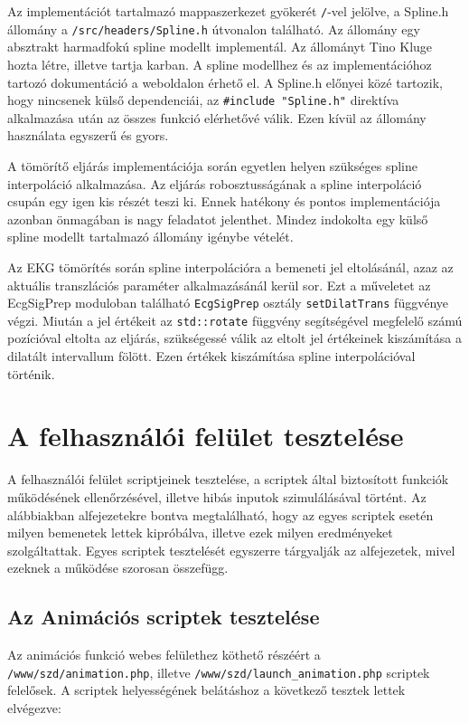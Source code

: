 \documentclass[oneside,titlepage,12pt,a4paper]{report}
\begin{document}
Az implementációt tartalmazó mappaszerkezet gyökerét \texttt{/}-vel jelölve, a Spline.h állomány a \texttt{/src/headers/Spline.h} útvonalon található. Az állomány egy absztrakt harmadfokú spline modellt implementál. Az állományt Tino Kluge hozta létre, illetve tartja karban. A spline modellhez és az implementációhoz tartozó dokumentáció a \cite{splineEler} weboldalon érhető el. A Spline.h előnyei közé tartozik, hogy nincsenek külső dependenciái, az \texttt{\#include "Spline.h"} direktíva alkalmazása után az összes funkció elérhetővé válik. Ezen kívül az állomány használata egyszerű és gyors.
\par A tömörítő eljárás implementációja során egyetlen helyen szükséges spline interpoláció alkalmazása. Az eljárás robosztusságának a spline interpoláció csupán egy igen kis részét teszi ki. Ennek hatékony és pontos implementációja azonban önmagában is nagy feladatot jelenthet. Mindez indokolta egy külső spline modellt tartalmazó állomány igénybe vételét. 
\par Az EKG tömörítés során spline interpolációra a bemeneti jel eltolásánál, azaz az aktuális transzlációs paraméter alkalmazásánál kerül sor. Ezt a műveletet az EcgSigPrep moduloban található \texttt{EcgSigPrep} osztály \texttt{setDilatTrans} függvénye végzi. Miután a jel értékeit az \texttt{std::rotate} függvény segítségével megfelelő számú pozícióval eltolta az eljárás, szükségessé válik az eltolt jel értékeinek kiszámítása a dilatált intervallum fölött. Ezen értékek kiszámítása spline interpolációval történik.

\section{A felhasználói felület tesztelése}

A felhasználói felület scriptjeinek tesztelése, a scriptek által biztosított funkciók működésének ellenőrzésével, illetve hibás inputok szimulálásával történt. Az alábbiakban alfejezetekre bontva megtalálható, hogy az egyes scriptek esetén milyen bemenetek lettek kipróbálva, illetve ezek milyen eredményeket szolgáltattak. Egyes scriptek tesztelését egyszerre tárgyalják az alfejezetek, mivel ezeknek a működése szorosan összefügg.

\subsection{Az Animációs scriptek tesztelése}

Az animációs funkció webes felülethez köthető részéért a \texttt{/www/szd/animation.php}, illetve \texttt{/www/szd/launch\_animation.php} scriptek felelősek. A scriptek helyességének belátáshoz a következő tesztek lettek elvégezve:
\end{document}
